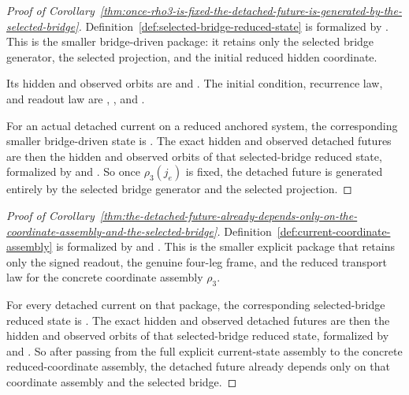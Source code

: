 \begin{proof}[Proof of Corollary~\ref{thm:once-rho3-is-fixed-the-detached-future-is-generated-by-the-selected-bridge}]
\label{proof:thm:once-rho3-is-fixed-the-detached-future-is-generated-by-the-selected-bridge}
Definition~\ref{def:selected-bridge-reduced-state} is formalized by
. This is the smaller bridge-driven
package: it retains only the selected bridge generator, the selected
projection, and the initial reduced hidden coordinate.

Its hidden and observed orbits are
and
. The initial
condition, recurrence law, and readout law are
,
,
and
.

For an actual detached current on a reduced anchored system, the corresponding
smaller bridge-driven state is
. The
exact hidden and observed detached futures are then the hidden and observed
orbits of that selected-bridge reduced state, formalized by
and
.
So once \(\rho_3(j_e)\) is fixed, the detached future is generated entirely by
the selected bridge generator and the selected projection.
\end{proof}

\begin{proof}[Proof of Corollary~\ref{thm:the-detached-future-already-depends-only-on-the-coordinate-assembly-and-the-selected-bridge}]
\label{proof:thm:the-detached-future-already-depends-only-on-the-coordinate-assembly-and-the-selected-bridge}
Definition~\ref{def:current-coordinate-assembly} is formalized by
 and
. This is the smaller
explicit package that retains only the signed readout, the genuine four-leg
frame, and the reduced transport law for the concrete coordinate assembly
\(\rho_3\).

For every detached current on that package, the corresponding selected-bridge
reduced state is
.
The exact hidden and observed detached futures are then the hidden and observed
orbits of that selected-bridge reduced state, formalized by
and
.
So after passing from the full explicit current-state assembly to the concrete
reduced-coordinate assembly, the detached future already depends only on that
coordinate assembly and the selected bridge.
\end{proof}

